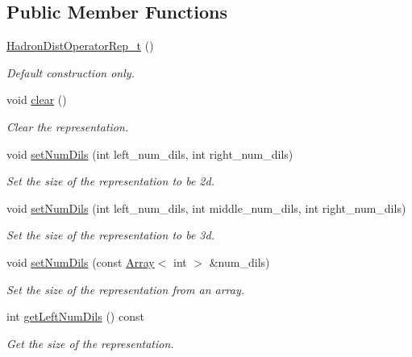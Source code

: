 \subsection*{Public Member Functions}
\begin{DoxyCompactItemize}
\item 
\mbox{\hyperlink{classHadron_1_1HadronDistOperatorRep__t_a697bc290991416e1c06d018553c1d9b7}{Hadron\+Dist\+Operator\+Rep\+\_\+t}} ()
\begin{DoxyCompactList}\small\item\em Default construction only. \end{DoxyCompactList}\item 
void \mbox{\hyperlink{classHadron_1_1HadronDistOperatorRep__t_a8d4c5288c2e0dd19b4af4127eb26a9cd}{clear}} ()
\begin{DoxyCompactList}\small\item\em Clear the representation. \end{DoxyCompactList}\item 
void \mbox{\hyperlink{classHadron_1_1HadronDistOperatorRep__t_adde38342364887f39b718d5ab981cd1e}{set\+Num\+Dils}} (int left\+\_\+num\+\_\+dils, int right\+\_\+num\+\_\+dils)
\begin{DoxyCompactList}\small\item\em Set the size of the representation to be 2d. \end{DoxyCompactList}\item 
void \mbox{\hyperlink{classHadron_1_1HadronDistOperatorRep__t_a3e971d8bbb79f0024b87f54b4db56083}{set\+Num\+Dils}} (int left\+\_\+num\+\_\+dils, int middle\+\_\+num\+\_\+dils, int right\+\_\+num\+\_\+dils)
\begin{DoxyCompactList}\small\item\em Set the size of the representation to be 3d. \end{DoxyCompactList}\item 
void \mbox{\hyperlink{classHadron_1_1HadronDistOperatorRep__t_ae1052d3d087b32a01f02eda6e802d196}{set\+Num\+Dils}} (const \mbox{\hyperlink{classXMLArray_1_1Array}{Array}}$<$ int $>$ \&num\+\_\+dils)
\begin{DoxyCompactList}\small\item\em Set the size of the representation from an array. \end{DoxyCompactList}\item 
int \mbox{\hyperlink{classHadron_1_1HadronDistOperatorRep__t_a03543084705a6d1349dfd54b79e0aef9}{get\+Left\+Num\+Dils}} () const
\begin{DoxyCompactList}\small\item\em Get the size of the representation. \end{DoxyCompactList}\item 

\end{DoxyCompactItemize}
